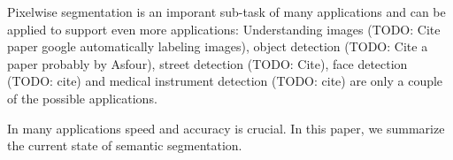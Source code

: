 Pixelwise segmentation is an imporant sub-task of many applications and can be
applied to support even more applications: Understanding images (TODO: Cite paper google automatically labeling images), object detection (TODO: Cite a paper probably by Asfour),
street detection (TODO: Cite), face detection (TODO: cite) and medical instrument
detection (TODO: cite) are only a couple of the possible applications.

In many applications speed and accuracy is crucial. In this paper, we summarize
the current state of semantic segmentation.
